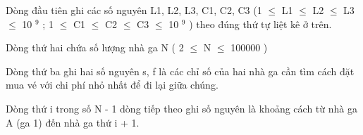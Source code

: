 Dòng đầu tiên ghi các số nguyên L1, L2, L3, C1, C2, C3 (1  $\le$  L1  $\le$  L2  $\le$  L3  $\le$  10   $^    9   $   ;  1  $\le$  C1  $\le$  C2  $\le$  C3  $\le$  10   $^    9   $   ) theo đúng thứ tự liệt kê ở trên.  

   Dòng thứ hai chứa số lượng nhà ga N ( 2  $\le$  N  $\le$  100000 )  

   Dòng thứ ba ghi hai số nguyên s, f là các chỉ số của hai nhà ga cần tìm cách đặt mua vé với chi phí nhỏ nhất để đi lại giữa chúng.  

   Dòng thứ i trong số N - 1 dòng tiếp theo ghi số nguyên là khoảng cách từ nhà ga A (ga 1) đến nhà ga thứ i + 1.  

\